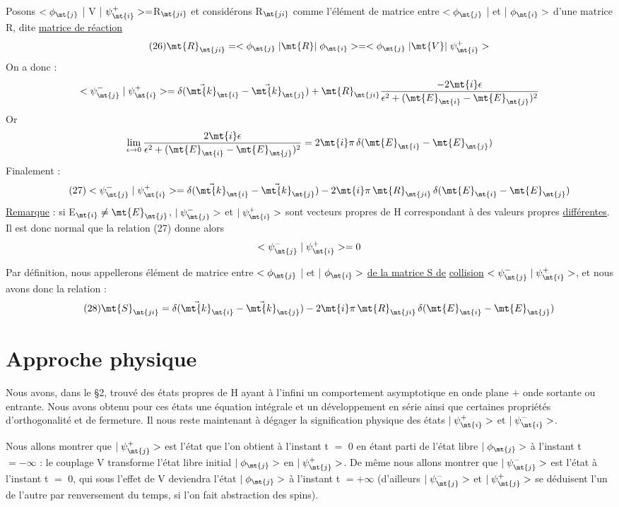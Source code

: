 Posons $<\phi_\mt{j}$ | V | $\psi_\mt{i}^+>=$R$_\mt{ji}$ et considérons R$_\mt{ji}$ comme l'élément de
matrice entre $<\phi_\mt{j}$ | et | $\phi_\mt{i}>$ d'une matrice R,
dite \ul{matrice de réaction}
\[
\tag{26}\mt{R}_\mt{ji}=<\phi_\mt{j}\;|\mt{ R }|\;\phi_\mt{i}>=<\phi_\mt{j}\;|\mt{ V }|\;\psi_\mt{i}^+>
\]
On a donc :
\[
<\psi_\mt{j}^-\;|\;\psi_\mt{i}^+>=\delta({\vec{\mt{k}}_\mt{i}}-{\vec{\mt{k}}_\mt{j}})+
\mt{R}_\mt{ji}
\frac{-2\mt{i}\epsilon}{\epsilon^2+(\mt{E}_\mt{i}-\mt{E}_\mt{j})^2}
\]
Or
\[
\lim_{\epsilon\to0}\frac{2\mt{i}\epsilon}{\epsilon^2+(\mt{E}_\mt{i}-\mt{E}_\mt{j})^2}=
2\mt{i}\pi\,\delta(\mt{E}_\mt{i}-\mt{E}_\mt{j})
\]
Finalement :
\[
\tag{27}<\psi_\mt{j}^-\;|\;\psi_\mt{i}^+>=\delta({\vec{\mt{k}}_\mt{i}}-{\vec{\mt{k}}_\mt{j}})-
2\mt{i}\pi\,\mt{R}_\mt{ji}\,\delta(\mt{E}_\mt{i}-\mt{E}_\mt{j})
\]
\ul{Remarque} : si E$_\mt{i}\neq\mt{E}_\mt{j}$, $|\;\psi_\mt{j}^->$ et $|\;\psi_\mt{i}^+>$
sont vecteurs propres de H correspondant
à des valeurs propres \ul{différentes}. Il est donc normal que la relation
(27) donne alors
\[
<\psi_\mt{j}^-\;|\;\psi_\mt{i}^+>=0
\]

Par définition, nous appellerons élément de matrice entre $<\phi_\mt{j}$ | et | $\phi_\mt{i}>$
\ul{de la matrice S de} \ul{collision} $<\psi_\mt{j}^-\;|\;\psi_\mt{i}^+>$, et nous
avons donc la relation :
\[
\tag{28}\mt{S}_\mt{ji}=\delta({\vec{\mt{k}}_\mt{i}}-{\vec{\mt{k}}_\mt{j}})-
2\mt{i}\pi\,\mt{R}_\mt{ji}\,\delta(\mt{E}_\mt{i}-\mt{E}_\mt{j})
\]

\section{Approche physique}%

Nous avons, dans le \S 2, trouvé des états propres de H
ayant à l'infini un comportement asymptotique en onde plane $+$ onde sortante ou
entrante. Nous avons obtenu pour ces états une équation intégrale et un développement
en série ainsi que certaines propriétés d'orthogonalité et de fermeture.
Il nous reste maintenant à dégager la signification physique des états $|\;\psi_\mt{i}^+>$
et $|\;\psi_\mt{i}^->$.

Nous allons montrer que $|\;\psi_\mt{j}^+>$ est l'état que l'on obtient
à l'instant t $=$ 0 en étant parti de l'état libre $|\;\phi_\mt{j}>$ à l'instant
t $= -\infty$ : le couplage V transforme l'état libre initial $|\;\phi_\mt{j}>$ en $|\;\psi_\mt{j}^+>$.
De même nous allons montrer que $|\;\psi_\mt{j}^->$ est l'état à l'instant t $=$ 0, qui
sous l'effet de V deviendra l'état $|\;\phi_\mt{j}>$ à l'instant t $= +\infty$ (d'ailleurs
$|\;\psi_\mt{j}^->$ et $|\;\psi_\mt{j}^+>$ se déduisent l'un de l'autre par renversement du temps,
si l'on fait abstraction des spins).

